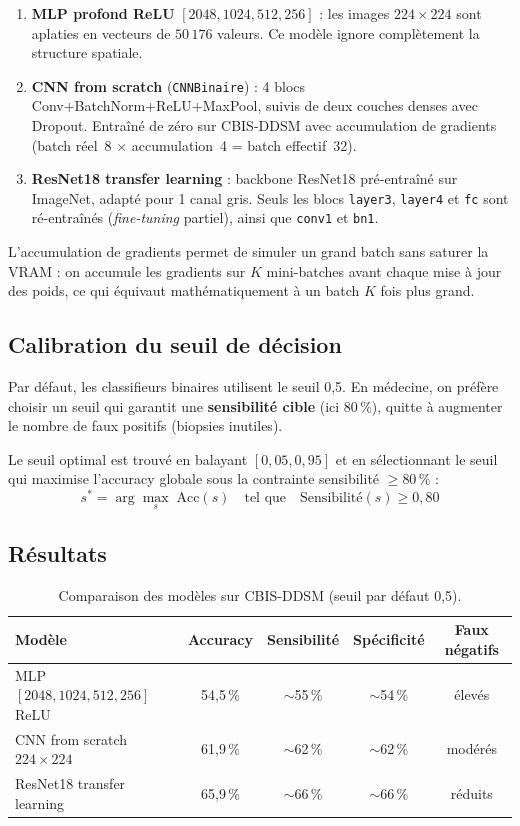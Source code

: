 \documentclass[a4paper,10pt]{article}
\begin{document}
\begin{enumerate}
    \item \textbf{MLP profond ReLU} $[2048, 1024, 512, 256]$ : les images $224 \times 224$ sont aplaties
          en vecteurs de $50\,176$ valeurs. Ce modèle ignore complètement la structure spatiale.
    \item \textbf{CNN from scratch} (\texttt{CNNBinaire}) : 4 blocs Conv+BatchNorm+ReLU+MaxPool,
          suivis de deux couches denses avec Dropout. Entraîné de zéro sur CBIS-DDSM avec
          accumulation de gradients (batch réel~8 $\times$ accumulation~4 = batch effectif~32).
    \item \textbf{ResNet18 transfer learning} : backbone ResNet18 pré-entraîné sur ImageNet,
          adapté pour 1 canal gris. Seuls les blocs \texttt{layer3}, \texttt{layer4} et \texttt{fc}
          sont ré-entraînés (\textit{fine-tuning} partiel), ainsi que \texttt{conv1} et \texttt{bn1}.
\end{enumerate}

L'accumulation de gradients permet de simuler un grand batch sans saturer la VRAM :
on accumule les gradients sur $K$ mini-batches avant chaque mise à jour des poids,
ce qui équivaut mathématiquement à un batch $K$ fois plus grand.

\subsection{Calibration du seuil de décision}

Par défaut, les classifieurs binaires utilisent le seuil 0,5.
En médecine, on préfère choisir un seuil qui garantit une \textbf{sensibilité cible} (ici 80\,\%),
quitte à augmenter le nombre de faux positifs (biopsies inutiles).

Le seuil optimal est trouvé en balayant $[0{,}05, 0{,}95]$ et en sélectionnant
le seuil qui maximise l'accuracy globale sous la contrainte sensibilité $\geq 80\,\%$ :
\[
s^* = \arg\max_{s} \;\mathrm{Acc}(s) \quad \text{tel que} \quad \mathrm{Sensibilité}(s) \geq 0{,}80
\]

\subsection{Résultats}

\begin{table}[H]
\centering
\caption{Comparaison des modèles sur CBIS-DDSM (seuil par défaut 0,5).}
\begin{tabular}{lcccc}
\toprule
\textbf{Modèle} & \textbf{Accuracy} & \textbf{Sensibilité} & \textbf{Spécificité} & \textbf{Faux négatifs} \\
\midrule
MLP $[2048,1024,512,256]$ ReLU & 54,5\,\%  & $\sim$55\,\% & $\sim$54\,\% & élevés \\
CNN from scratch $224\times224$ & 61,9\,\%  & $\sim$62\,\% & $\sim$62\,\% & modérés \\
ResNet18 transfer learning      & 65,9\,\%  & $\sim$66\,\% & $\sim$66\,\% & réduits \\
\bottomrule
\end{tabular}
\label{tab:ddsm_resultats}
\end{table}
\end{document}
